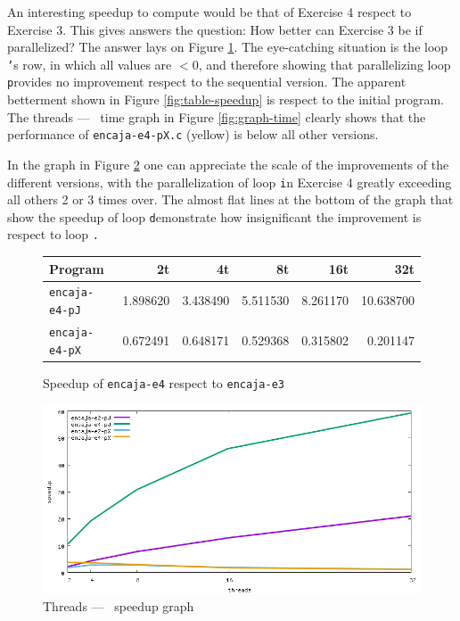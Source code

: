 \documentclass[a4paper]{article}
\newcommand{\m}[1]{\texttt{#1}}
\newcommand{\x}[1]{\m{#1}}
\renewcommand{\j}[1]{\m{#1}}
\begin{document}
An interesting speedup to compute would be that of Exercise 4 respect to Exercise 3. This gives answers the question: How better can Exercise 3 be if parallelized? The answer lays on Figure \ref{fig:table-speedupR3}. The eye-catching situation is the loop \x's row, in which all values are $<0$, and therefore showing that parallelizing loop \x provides no improvement respect to the sequential version. The apparent betterment shown in Figure \ref{fig:table-speedup} is respect to the initial program. The threads --- \unskip \, time graph in Figure \ref{fig:graph-time} clearly shows that the performance of \m{encaja-e4-pX.c} (yellow) is below all other versions.

In the graph in Figure \ref{fig:graph-speedup} one can appreciate the scale of the improvements of the different versions, with the parallelization of loop \j in Exercise 4 greatly exceeding all others 2 or 3 times over. The almost flat lines at the bottom of the graph that show the speedup of loop \x demonstrate how insignificant the improvement is respect to loop \j.

\begin{figure}[h]
    \centering
    \begin{tabular}{l r r r r r}
        Program               & 2t       & 4t       & 8t       & 16t      & 32t       \\ \hline
        \m{encaja-e4-pJ}	  & 1.898620 & 3.438490 & 5.511530 & 8.261170 & 10.638700 \\
        \m{encaja-e4-pX}	  & 0.672491 & 0.648171 & 0.529368 & 0.315802 &  0.201147 \\ \hline
    \end{tabular}
    \caption{Speedup of \m{encaja-e4} respect to \m{encaja-e3}}
    \label{fig:table-speedupR3}
\end{figure}

\begin{figure}[h]
    \centering
    \includegraphics[width=\textwidth]{../img/speedup}
    \caption{Threads --- \unskip \, speedup graph}
    \label{fig:graph-speedup}
\end{figure}
\end{document}
